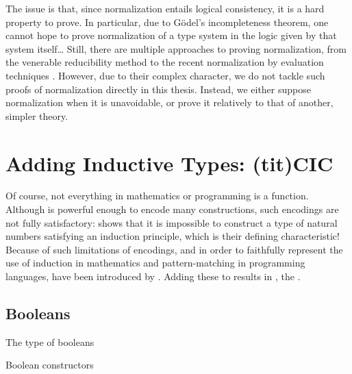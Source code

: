The issue is that, since normalization entails logical consistency, it is a hard
property to prove. In particular, due to Gödel’s incompleteness theorem, one cannot hope
to prove normalization of a type system in the logic given by that system itself…
Still, there are multiple approaches to proving normalization, from the venerable
reducibility method  to the recent normalization by evaluation 
techniques . However, due to their complex character, 
we do not tackle such proofs of normalization directly in this thesis. Instead, we
either suppose normalization when it is unavoidable,
or prove it relatively to that of another, simpler theory.

\section{Adding Inductive Types: \kl(tit){CIC}}
\label{sec:tech-cic}

\AP Of course, not everything in mathematics or programming is a function.
Although  is powerful enough to encode many constructions,
such encodings are not fully satisfactory:  shows
that it is impossible to construct a type of natural numbers
satisfying an induction principle, which is their defining characteristic!
Because of such limitations of encodings, and in order to faithfully
represent the use of induction in mathematics and pattern-matching in programming languages,
 have been introduced by .
Adding these to  results in ,
the .

\subsection{Booleans}

\begin{marginfigure}
  \ContinuedFloat*
  \begin{mathpar}
    \label{rule:bool-type}
  \end{mathpar}
  \caption{The type of booleans}
  \label{fig:bool-type}
\end{marginfigure}

\begin{marginfigure}
  \ContinuedFloat
  \caption{Boolean constructors}
  \label{fig:bool-cons}
\end{marginfigure}


